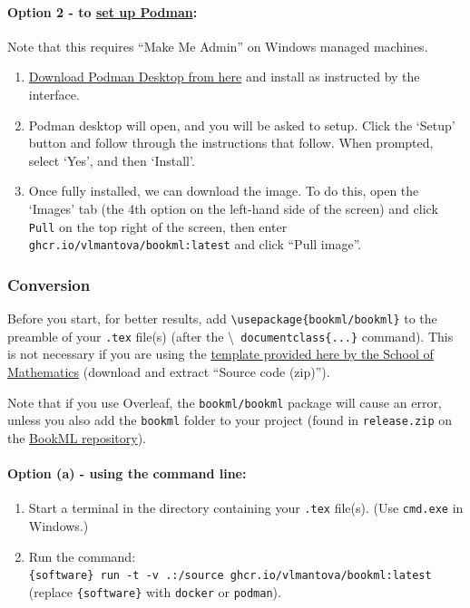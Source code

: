 \paragraph{Option 2 - to \href{https://podman.io/docs/installation}{set up Podman}:}

Note that this requires ``Make Me Admin'' on Windows managed machines.

\begin{enumerate}
    \item \href{https://podman.io/}{Download Podman Desktop from here} and install as instructed by the interface. 
    \item Podman desktop will open, and you will be asked to setup.
    Click the `Setup' button and follow through the instructions 
    that follow. When prompted, select `Yes', and then `Install'. 
    \item Once fully installed, we can download the image. To do this, open the `Images' tab
        (the 4th option on the left-hand side of the screen) and click \verb|Pull| on the top right of the screen, then enter \verb|ghcr.io/vlmantova/bookml:latest| and click ``Pull image''. 
\end{enumerate}

\subsubsection{Conversion}
\label{sssec:conversion}

Before you start, for better results, add \verb|\usepackage{bookml/bookml}| to the preamble of your \verb|.tex| file(s) (after the \textbackslash\verb| documentclass{...}| command). This is not necessary if you are using the \href{https://github.com/UoE-School-of-Mathematics/Workflow-Template-Blank/releases}{template provided here by the School of Mathematics} (download and extract ``Source code (zip)'').

Note that if you use Overleaf, the \verb|bookml/bookml| package will cause an error, unless you also add the \verb|bookml| folder to your project (found in \verb|release.zip| on the \href{https://github.com/vlmantova/bookml/releases}{BookML repository}).

\paragraph{Option (a) - using the command line:}

\begin{enumerate}
    \item Start a terminal in the directory containing your \verb|.tex| file(s). (Use \verb|cmd.exe| in Windows.)
    \item Run the command:\\
        \verb|{software} run -t -v .:/source ghcr.io/vlmantova/bookml:latest|\\
        (replace \verb|{software}| with \verb|docker| or \verb|podman|).
\end{enumerate}

